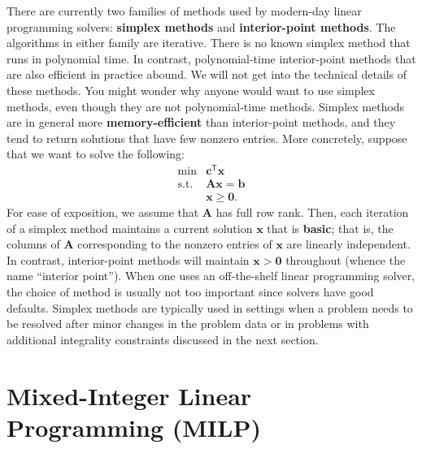 There are currently two families of methods used by modern-day linear
programming solvers: \textbf{simplex methods} and \textbf{interior-point methods}. The
algorithms in either family are iterative. There is no known simplex
method that runs in polynomial time. In contrast, polynomial-time
interior-point methods that are also efficient in practice abound. We will not get into the technical details of these methods. \newl You might wonder why anyone would want to use simplex methods, even though they are not polynomial-time methods. Simplex methods are in general more \textbf{memory-efficient} than interior-point methods, and they tend to return solutions that have few nonzero entries. More
concretely, suppose that we want to solve the following:
\[\begin{array}{rl}
\min & \mathbf{c}^\mathsf{T}\mathbf{x} \\
\mbox{s.t.} & \mathbf{A}\mathbf{x} = \mathbf{b} \\
            & \mathbf{x} \geq \mathbf{0}.
\end{array}\] For ease of exposition, we assume that \(\mathbf{A}\) has
full row rank. Then, each iteration of a simplex method maintains a
current solution \(\mathbf{x}\) that is \textbf{basic}; that is, the columns of
\(\mathbf{A}\) corresponding to the nonzero entries of \(\mathbf{x}\)
are linearly independent. In contrast, interior-point methods will
maintain \(\mathbf{x} > \mathbf{0}\) throughout (whence the name
``interior point'').
\newl When one uses an off-the-shelf linear programming solver, the choice of
method is usually not too important since solvers have good defaults.
Simplex methods are typically used in settings when a problem needs to
be resolved after minor changes in the problem data or in problems with
additional integrality constraints discussed in the next section.


\section{Mixed-Integer Linear Programming
(MILP)}

